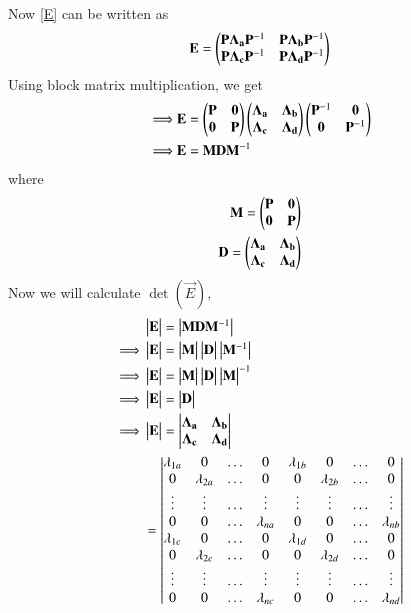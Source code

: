 \documentclass[journal,12pt,twocolumn]{IEEEtran}
\begin{document}
Now \eqref{E} can be written as
\begin{align}
    \mathbf{E}=\begin{pmatrix}\mathbf{P}\mathbf{\Lambda_a}\mathbf{P}^{-1} & \mathbf{P}\mathbf{\Lambda_b}\mathbf{P}^{-1}\\\mathbf{P}\mathbf{\Lambda_c}\mathbf{P}^{-1} & \mathbf{P}\mathbf{\Lambda_d}\mathbf{P}^{-1}\end{pmatrix}
\end{align}
Using block matrix multiplication, we get
\begin{align}
    \implies&\mathbf{E}=\begin{pmatrix}\mathbf{P} & \mathbf{0}\\\mathbf{0} & \mathbf{P}\end{pmatrix}\begin{pmatrix}\mathbf{\Lambda_a} & \mathbf{\Lambda_b}\\\mathbf{\Lambda_c} & \mathbf{\Lambda_d}\end{pmatrix}\begin{pmatrix}\mathbf{P}^{-1} & \mathbf{0}\\\mathbf{0} & \mathbf{P}^{-1}\end{pmatrix}\\
    \implies&\mathbf{E}=\mathbf{M}\mathbf{D}\mathbf{M}^{-1}
\end{align}
where
\begin{align}
    \mathbf{M}=\begin{pmatrix}\mathbf{P} & \mathbf{0}\\\mathbf{0} & \mathbf{P}\end{pmatrix}\\
    \mathbf{D}=\begin{pmatrix}\mathbf{\Lambda_a} & \mathbf{\Lambda_b}\\\mathbf{\Lambda_c} & \mathbf{\Lambda_d}\end{pmatrix}
\end{align}
Now we will calculate $\det(\vec{E})$,
\begin{align}
    &\begin{vmatrix}\mathbf{E}\end{vmatrix}=\begin{vmatrix}\mathbf{M}\mathbf{D}\mathbf{M}^{-1}\end{vmatrix}\\
    \implies&\begin{vmatrix}\mathbf{E}\end{vmatrix}=\begin{vmatrix}\mathbf{M}\end{vmatrix}\begin{vmatrix}\mathbf{D}\end{vmatrix}\begin{vmatrix}\mathbf{M}^{-1}\end{vmatrix}\\
    \implies&\begin{vmatrix}\mathbf{E}\end{vmatrix}=\begin{vmatrix}\mathbf{M}\end{vmatrix}\begin{vmatrix}\mathbf{D}\end{vmatrix}\begin{vmatrix}\mathbf{M}\end{vmatrix}^{-1}\\
    \implies&\begin{vmatrix}\mathbf{E}\end{vmatrix}=\begin{vmatrix}\mathbf{D}\end{vmatrix}\\
    \implies&\begin{vmatrix}\mathbf{E}\end{vmatrix}=\begin{vmatrix}\mathbf{\Lambda_a} & \mathbf{\Lambda_b}\\\mathbf{\Lambda_c} & \mathbf{\Lambda_d}\end{vmatrix}\\
    &=\begin{vmatrix}\lambda_{1a}&0&\dots&0&\lambda_{1b}&0&\dots&0\\0&\lambda_{2a}&\dots&0&0&\lambda_{2b}&\dots&0\\\vdots&\vdots&\dots&\vdots&\vdots&\vdots&\dots&\vdots\\0&0&\dots&\lambda_{na}&0&0&\dots&\lambda_{nb}\\\lambda_{1c}&0&\dots&0&\lambda_{1d}&0&\dots&0\\0&\lambda_{2c}&\dots&0&0&\lambda_{2d}&\dots&0\\\vdots&\vdots&\dots&\vdots&\vdots&\vdots&\dots&\vdots\\0&0&\dots&\lambda_{nc}&0&0&\dots&\lambda_{nd}\end{vmatrix}
\end{align}
\end{document}
